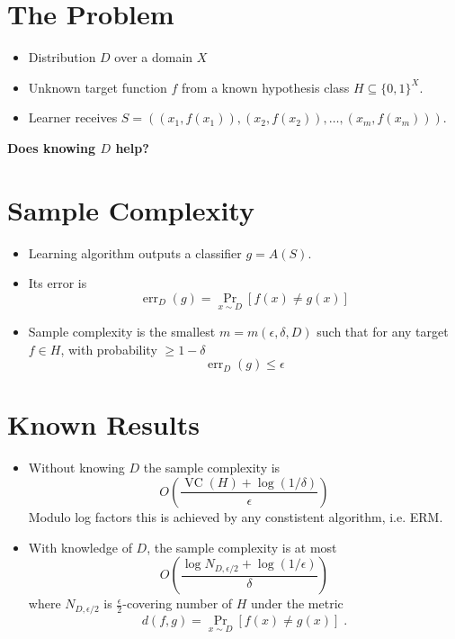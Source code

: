 \documentclass[30pt,landscape]{sciposter}
\DeclareMathOperator{\err}{err}
\DeclareMathOperator{\VC}{VC}
\begin{document}
\setlength{\parindent}{0em}
\setlength{\columnsep}{4cm}
\begin{multicols}{3}

\section*{The Problem}

\begin{itemize}
\item Distribution $D$ over a domain $X$
\item Unknown target function $f$ from a known hypothesis class $H \subseteq \{0,1\}^X$.
\item Learner receives $S = ((x_1, f(x_1)), (x_2, f(x_2)), \dots, (x_m, f(x_m)))$.
\end{itemize}

\vspace{1cm}

\textbf{Does knowing $D$ help?}

\section*{Sample Complexity}

\begin{itemize}
\item Learning algorithm outputs a classifier $g=A(S)$.
\item Its error is
$$
\err_D(g) = \Pr_{x \sim D}[f(x)\neq g(x)]
$$
\item Sample complexity is the smallest $m = m(\epsilon,\delta,D)$ such that for any target $f \in H$,
with probability $\ge 1 - \delta$
$$
\err_D(g) \le \epsilon
$$
\end{itemize}

\section*{Known Results}

\begin{itemize}
\item Without knowing $D$ the sample complexity is
$$
O \left( \frac{\VC(H) + \log(1/\delta)}{\epsilon} \right)
$$
Modulo log factors this is achieved by any constistent algorithm, i.e. ERM.

\vspace{0.5cm}

\item With knowledge of $D$, the sample complexity is at most
$$
O\left(\frac{\log N_{D,\epsilon/2} + \log(1/\epsilon)}{\delta} \right)
$$
where $N_{D,\epsilon/2}$ is $\frac{\epsilon}{2}$-covering number
of $H$ under the metric
$$
d(f,g) = \Pr_{x \sim D}[f(x) \neq g(x)] \; .
$$


\end{itemize}
\end{multicols}
\end{document}
